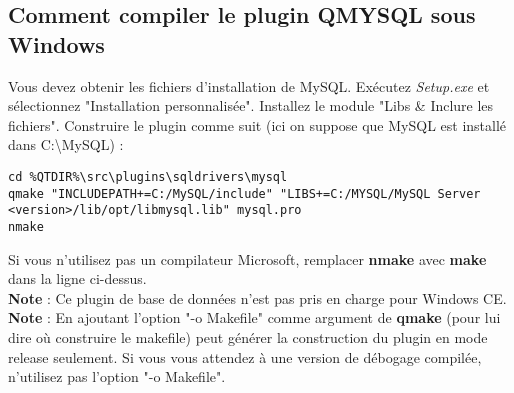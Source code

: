 \documentclass[11pt,fleqn]{report}
\begin{document}
\subsection{Comment compiler le plugin QMYSQL sous Windows}
 Vous devez obtenir les fichiers d'installation de MySQL. Exécutez \textit{Setup.exe} et sélectionnez "Installation personnalisée". Installez le module "Libs \& Inclure les fichiers". Construire le plugin comme suit (ici on suppose que MySQL est installé dans C:\textbackslash MySQL) :
\begin{lstlisting}
cd %QTDIR%\src\plugins\sqldrivers\mysql
qmake "INCLUDEPATH+=C:/MySQL/include" "LIBS+=C:/MYSQL/MySQL Server <version>/lib/opt/libmysql.lib" mysql.pro
nmake
\end{lstlisting}

Si vous n'utilisez pas un compilateur Microsoft, remplacer \textbf{nmake} avec \textbf{make} dans la ligne ci-dessus.
\\

\textbf{Note} : Ce plugin de base de données n'est pas pris en charge pour Windows CE. \\
\textbf{Note} : En ajoutant l'option "-o Makefile" comme argument de \textbf{qmake} (pour lui dire où construire le makefile) peut générer la construction du plugin en mode release seulement. Si vous vous attendez à une version de débogage compilée, n'utilisez pas l'option "-o Makefile".
\end{document}
